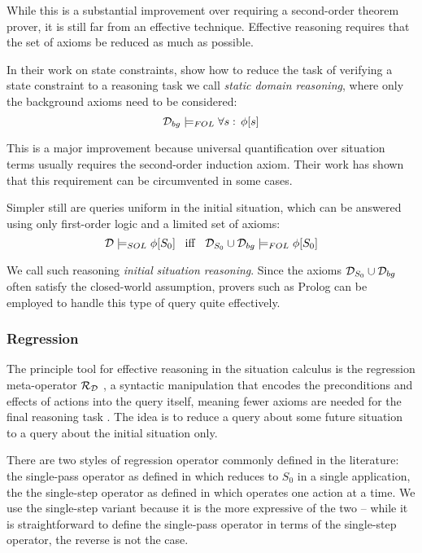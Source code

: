 While this is a substantial improvement over requiring a second-order
theorem prover, it is still far from an effective technique. Effective
reasoning requires that the set of axioms be reduced as much as possible.

In their work on state constraints, \citet{Lin94-StateConstraints}
show how to reduce the task of verifying a state constraint to a reasoning
task we call \emph{static domain reasoning}, where only the background
axioms need to be considered:\[
\mathcal{D}_{bg}\models_{FOL}\forall s:\,\phi[s]\]


This is a major improvement because universal quantification over
situation terms usually requires the second-order induction axiom.
Their work has shown that this requirement can be circumvented in
some cases.

Simpler still are queries uniform in the initial situation, which
can be answered using only first-order logic and a limited set of
axioms:\[
\mathcal{D}\models_{SOL}\phi[S_{0}]\,\,\,\,\,\mathit{\mathrm{iff}}\,\,\,\,\,\mathcal{D}_{S_{0}}\cup\mathcal{D}_{bg}\models_{FOL}\phi[S_{0}]\]


We call such reasoning \emph{initial} \emph{situation reasoning}.
Since the axioms $\mathcal{D}_{S_{0}}\cup\mathcal{D}_{bg}$ often satisfy the closed-world
assumption, provers such as Prolog can be employed to handle this
type of query quite effectively.


\subsubsection{Regression}

The principle tool for effective reasoning in the situation calculus
is the regression meta-operator $\mathcal{R}_{\mathcal{D}}$ , a syntactic manipulation
that encodes the preconditions and effects of actions into the query
itself, meaning fewer axioms are needed for the final reasoning task
\citep{pirri99contributions_sitcalc}. The idea is to reduce a query
about some future situation to a query about the initial situation
only.

There are two styles of regression operator commonly defined in the
literature: the single-pass operator as defined in \citep{pirri99contributions_sitcalc}
which reduces to $S_{0}$ in a single application, the the single-step
operator as defined in \citep{scherl03sc_knowledge} which operates
one action at a time. We use the single-step variant because it is
the more expressive of the two -- while it is straightforward to define
the single-pass operator in terms of the single-step operator, the
reverse is not the case.

